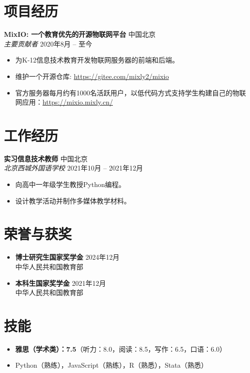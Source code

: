 \documentclass[a4paper,9pt]{extarticle}
\begin{document}
\section*{项目经历}
\noindent
\textbf{MixIO: 一个教育优先的开源物联网平台} \hfill 中国北京\\ %
\textit{主要贡献者} \hfill 2020年8月 – 至今 %

\begin{itemize}
    \item 为K-12信息技术教育开发物联网服务器的前端和后端。
    \item 维护一个开源仓库: \url{https://gitee.com/mixly2/mixio}
    \item 官方服务器每月约有1000名活跃用户，以低代码方式支持学生构建自己的物联网应用：\url{https://mixio.mixly.cn/}
\end{itemize}

\section*{工作经历}
\noindent
\textbf{实习信息技术教师} \hfill 中国北京\\ %
\textit{北京西城外国语学校} \hfill 2021年10月 – 2021年12月 %

\begin{itemize}
    \item 向高中一年级学生教授Python编程。
    \item 设计教学活动并制作多媒体教学材料。
\end{itemize}

\section*{荣誉与获奖}
\begin{itemize}
    \item \textbf{博士研究生国家奖学金} \hfill 2024年12月 \\
          \hfill 中华人民共和国教育部
    \item \textbf{本科生国家奖学金} \hfill 2021年12月 \\
          \hfill 中华人民共和国教育部
\end{itemize}

\section*{技能}
\begin{itemize}
    \item \textbf{雅思（学术类）：7.5}（听力：8.0，阅读：8.5，写作：6.5，口语：6.0）
    \item Python（熟练），JavaScript（熟练），R（熟悉），Stata（熟悉）
\end{itemize}

\end{document}
